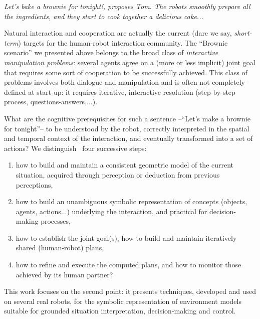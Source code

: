 {\em \emph{Let's bake a brownie for tonight!}, proposes Tom. The robots
smoothly prepare all the ingredients, and they start to cook together a
delicious cake...}

Natural interaction and cooperation are actually the current (dare we say,
\emph{short-term}) targets for the human-robot interaction community.  The
``Brownie scenario'' we presented above belongs to the broad class of
\emph{interactive manipulation problems}: several agents agree on a (more or
less implicit) joint goal that requires some sort of cooperation to be
successfully achieved. This class of problems involves both dialogue and
manipulation and is often not completely defined at start-up: it requires
iterative, interactive resolution (step-by-step process,
questions-answers,...).

What are the cognitive prerequisites for such a sentence --``Let's make a
brownie for tonight''-- to be understood by the robot, correctly interpreted in
the spatial and temporal context of the interaction, and eventually transformed
into a set of actions? We distinguish~\cite{Lemaignan2012} four successive
steps:

\begin{enumerate}

    \item how to build and maintain a consistent geometric model of the current
        situation, acquired through perception or deduction from previous
        perceptions,

    \item how to build an unambiguous symbolic representation of concepts
        (objects, agents, actions...) underlying the interaction, and practical
        for decision-making processes,

    \item how to establish the joint goal(s), how to build and maintain
        iteratively shared (human-robot) plans, 

    \item how to refine and execute the computed plans, and how to monitor
        those achieved by its human partner?

\end{enumerate}

This work focuses on the second point: it presents techniques, developed and
used on several real robots, for the symbolic representation of environment
models suitable for grounded situation interpretation, decision-making and
control.


